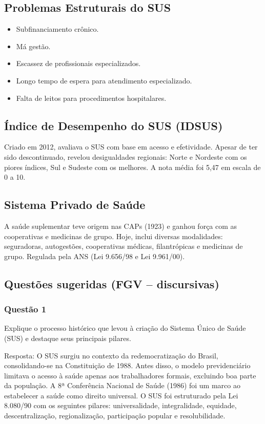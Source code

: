 \documentclass[a4paper,12pt]{article}
\begin{document}
\subsection{Problemas Estruturais do SUS}
\label{sec:orgb8a1b13}
\begin{itemize}
\item Subfinanciamento crônico.
\item Má gestão.
\item Escassez de profissionais especializados.
\item Longo tempo de espera para atendimento especializado.
\item Falta de leitos para procedimentos hospitalares.
\end{itemize}
\subsection{Índice de Desempenho do SUS (IDSUS)}
\label{sec:org50cbdff}
Criado em 2012, avaliava o SUS com base em acesso e efetividade. Apesar de ter sido descontinuado, revelou desigualdades regionais: Norte e Nordeste com os piores índices, Sul e Sudeste com os melhores. A nota média foi 5,47 em escala de 0 a 10.
\subsection{Sistema Privado de Saúde}
\label{sec:org5d2b5ee}
A saúde suplementar teve origem nas CAPs (1923) e ganhou força com as cooperativas e medicinas de grupo. Hoje, inclui diversas modalidades: seguradoras, autogestões, cooperativas médicas, filantrópicas e medicinas de grupo. Regulada pela ANS (Lei 9.656/98 e Lei 9.961/00).
\subsection{Questões sugeridas (FGV – discursivas)}
\label{sec:orgd5ea299}

\subsubsection{Questão 1}
\label{sec:orgabfae11}
Explique o processo histórico que levou à criação do Sistema Único de Saúde (SUS) e destaque seus principais pilares.

Resposta:
O SUS surgiu no contexto da redemocratização do Brasil, consolidando-se na Constituição de 1988. Antes disso, o modelo previdenciário limitava o acesso à saúde apenas aos trabalhadores formais, excluindo boa parte da população. A 8ª Conferência Nacional de Saúde (1986) foi um marco ao estabelecer a saúde como direito universal. O SUS foi estruturado pela Lei 8.080/90 com os seguintes pilares: universalidade, integralidade, equidade, descentralização, regionalização, participação popular e resolubilidade.
\end{document}
